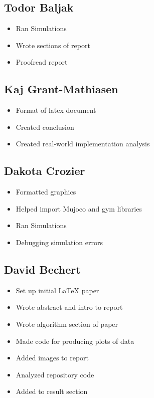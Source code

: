 \documentclass{article} %
\begin{document}
\begin{multicols}{2}

\subsection{Todor Baljak}
\begin{itemize}[itemsep=-2pt,topsep=-5pt, leftmargin=10pt]
\item Ran Simulations
\item Wrote sections of report
\item Proofread report
\end{itemize}

\subsection{Kaj Grant-Mathiasen}
\begin{itemize}[itemsep=-2pt,topsep=-5pt, leftmargin=10pt]
\item Format of latex document
\item Created conclusion
\item Created real-world implementation analysis
\end{itemize}

\subsection{Dakota Crozier}
\begin{itemize}[itemsep=-2pt,topsep=-5pt, leftmargin=10pt]
\item Formatted graphics
\item Helped import Mujoco and gym libraries
\item Ran Simulations
\item Debugging simulation errors
\end{itemize}

\columnbreak

\subsection{David Bechert}
\begin{itemize}[itemsep=-2pt,topsep=-5pt, leftmargin=10pt]
\item Set up initial LaTeX paper
\item Wrote abstract and intro to report
\item Wrote algorithm section of paper
\item Made code for producing plots of data
\item Added images to report
\item Analyzed repository code
\item Added to result section
\end{itemize}


\end{multicols}
\end{document}
